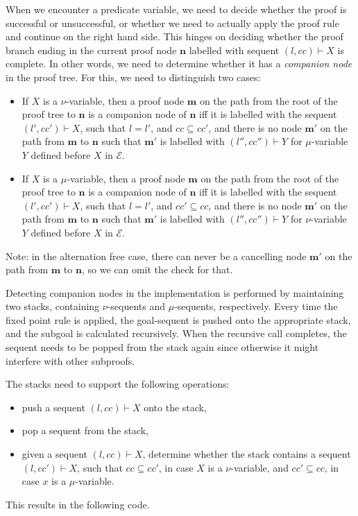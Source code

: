 \documentclass{article}
\newcommand{\loc}{l}
\newcommand{\region}{\mathit{cc}}
\begin{document}
When we encounter a predicate variable, we need to decide whether the proof is successful or unsuccessful, or whether we need to actually apply the proof rule and continue on the right hand side. This hinges on deciding whether the proof branch ending in the current proof node $\mathbf{n}$ labelled with sequent $(\loc, \region) \vdash X$ is complete. In other words, we need to determine whether it has a \emph{companion node} in the proof tree. For this, we need to distinguish two cases:
\begin{itemize}
  \item If $X$ is a $\nu$-variable, then a proof node $\mathbf{m}$ on the path from the root of the proof tree to $\mathbf{n}$ is a companion node of $\mathbf{n}$ iff it is labelled with the sequent $(\loc', \region') \vdash X$, such that $\loc = \loc'$, and $\region \subseteq \region'$, and there is no node $\mathbf{m'}$ on the path from $\mathbf{m}$ to $\mathbf{n}$ such that $\mathbf{m'}$ is labelled with $(\loc'', \region'') \vdash Y$ for $\mu$-variable $Y$ defined before $X$ in $\mathcal{E}$.
  \item If $X$ is a $\mu$-variable, then a proof node $\mathbf{m}$ on the path from the root of the proof tree to $\mathbf{n}$ is a companion node of $\mathbf{n}$ iff it is labelled with the sequent $(\loc', \region') \vdash X$, such that $\loc = \loc'$, and $\region' \subseteq \region$, and there is no node $\mathbf{m'}$ on the path from $\mathbf{m}$ to $\mathbf{n}$ such that $\mathbf{m'}$ is labelled with $(\loc'', \region'') \vdash Y$ for $\nu$-variable $Y$ defined before $X$ in $\mathcal{E}$.
\end{itemize}
Note: in the alternation free case, there can never be a cancelling node $\mathbf{m'}$ on the path from $\mathbf{m}$ to $\mathbf{n}$, so we can omit the check for that.

Detecting companion nodes in the implementation is performed by maintaining two stacks, containing $\nu$-sequents and $\mu$-sequents, respectively. Every time the fixed point rule is applied, the goal-sequent is pushed onto the appropriate stack, and the subgoal is calculated recursively. When the recursive call completes, the sequent needs to be popped from the stack again since otherwise it might interfere with other subproofs.

The stacks need to support the following operations:
\begin{itemize}
  \item push a sequent $(\loc, \region) \vdash X$ onto the stack,
  \item pop a sequent from the stack,
  \item given a sequent $(\loc, \region) \vdash X$, determine whether the stack contains a sequent $(\loc, \region') \vdash X$, such that $\region \subseteq \region'$, in case $X$ is a $\nu$-variable, and $\region' \subseteq \region$, in case $x$ is a $\mu$-variable.
\end{itemize}
This results in the following code.
\end{document}
